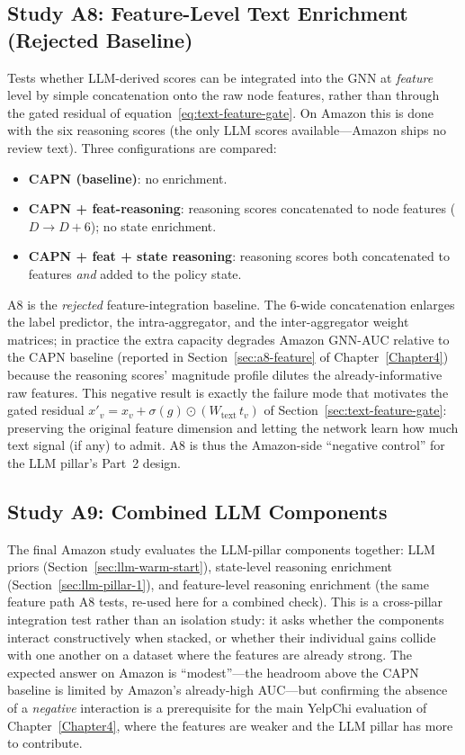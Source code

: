 \subsection{Study A8: Feature-Level Text Enrichment (Rejected Baseline)}
\label{sec:study-a8}

Tests whether LLM-derived scores can be integrated into the GNN at \emph{feature} level by simple concatenation onto the raw node features, rather than through the gated residual of equation~\eqref{eq:text-feature-gate}. On Amazon this is done with the six reasoning scores (the only LLM scores available---Amazon ships no review text). Three configurations are compared:

\begin{itemize}
    \item \textbf{CAPN (baseline)}: no enrichment.
    \item \textbf{CAPN + feat-reasoning}: reasoning scores concatenated to node features ($D \to D + 6$); no state enrichment.
    \item \textbf{CAPN + feat + state reasoning}: reasoning scores both concatenated to features \emph{and} added to the policy state.
\end{itemize}

A8 is the \emph{rejected} feature-integration baseline. The 6-wide concatenation enlarges the label predictor, the intra-aggregator, and the inter-aggregator weight matrices; in practice the extra capacity degrades Amazon GNN-AUC relative to the CAPN baseline (reported in Section~\ref{sec:a8-feature} of Chapter~\ref{Chapter4}) because the reasoning scores' magnitude profile dilutes the already-informative raw features. This negative result is exactly the failure mode that motivates the gated residual $x'_v = x_v + \sigma(g) \odot (W_{\text{text}}\, t_v)$ of Section~\ref{sec:text-feature-gate}: preserving the original feature dimension and letting the network learn how much text signal (if any) to admit. A8 is thus the Amazon-side ``negative control'' for the LLM pillar's Part~2 design.

\subsection{Study A9: Combined LLM Components}
\label{sec:study-a9}

The final Amazon study evaluates the LLM-pillar components together: LLM priors (Section~\ref{sec:llm-warm-start}), state-level reasoning enrichment (Section~\ref{sec:llm-pillar-1}), and feature-level reasoning enrichment (the same feature path A8 tests, re-used here for a combined check). This is a cross-pillar integration test rather than an isolation study: it asks whether the components interact constructively when stacked, or whether their individual gains collide with one another on a dataset where the features are already strong. The expected answer on Amazon is ``modest''---the headroom above the CAPN baseline is limited by Amazon's already-high AUC---but confirming the absence of a \emph{negative} interaction is a prerequisite for the main YelpChi evaluation of Chapter~\ref{Chapter4}, where the features are weaker and the LLM pillar has more to contribute.

